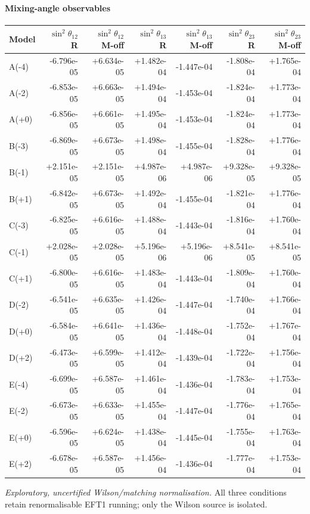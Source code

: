 \paragraph{Mixing-angle observables}
\begin{center}
\begin{tabular}{lrrrrrr}
\hline
Model & $\sin^2\theta_{12}$ R & $\sin^2\theta_{12}$ M-off & $\sin^2\theta_{13}$ R & $\sin^2\theta_{13}$ M-off & $\sin^2\theta_{23}$ R & $\sin^2\theta_{23}$ M-off \\
\hline
A(-4) & -6.796e-05 & +6.634e-05 & +1.482e-04 & -1.447e-04 & -1.808e-04 & +1.765e-04 \\
A(-2) & -6.853e-05 & +6.663e-05 & +1.494e-04 & -1.453e-04 & -1.824e-04 & +1.773e-04 \\
A(+0) & -6.856e-05 & +6.661e-05 & +1.495e-04 & -1.453e-04 & -1.824e-04 & +1.773e-04 \\
B(-3) & -6.869e-05 & +6.673e-05 & +1.498e-04 & -1.455e-04 & -1.828e-04 & +1.776e-04 \\
B(-1) & +2.151e-05 & +2.151e-05 & +4.987e-06 & +4.987e-06 & +9.328e-05 & +9.328e-05 \\
B(+1) & -6.842e-05 & +6.673e-05 & +1.492e-04 & -1.455e-04 & -1.821e-04 & +1.776e-04 \\
C(-3) & -6.825e-05 & +6.616e-05 & +1.488e-04 & -1.443e-04 & -1.816e-04 & +1.760e-04 \\
C(-1) & +2.028e-05 & +2.028e-05 & +5.196e-06 & +5.196e-06 & +8.541e-05 & +8.541e-05 \\
C(+1) & -6.800e-05 & +6.616e-05 & +1.483e-04 & -1.443e-04 & -1.809e-04 & +1.760e-04 \\
D(-2) & -6.541e-05 & +6.635e-05 & +1.426e-04 & -1.447e-04 & -1.740e-04 & +1.766e-04 \\
D(+0) & -6.584e-05 & +6.641e-05 & +1.436e-04 & -1.448e-04 & -1.752e-04 & +1.767e-04 \\
D(+2) & -6.473e-05 & +6.599e-05 & +1.412e-04 & -1.439e-04 & -1.722e-04 & +1.756e-04 \\
E(-4) & -6.699e-05 & +6.587e-05 & +1.461e-04 & -1.436e-04 & -1.783e-04 & +1.753e-04 \\
E(-2) & -6.673e-05 & +6.633e-05 & +1.455e-04 & -1.447e-04 & -1.776e-04 & +1.765e-04 \\
E(+0) & -6.596e-05 & +6.624e-05 & +1.438e-04 & -1.445e-04 & -1.755e-04 & +1.763e-04 \\
E(+2) & -6.678e-05 & +6.587e-05 & +1.456e-04 & -1.436e-04 & -1.777e-04 & +1.753e-04 \\
\hline
\end{tabular}
\end{center}
\noindent\emph{Exploratory, uncertified Wilson/matching normalisation.} 
All three conditions retain renormalisable EFT1 running; only the Wilson source is isolated.
